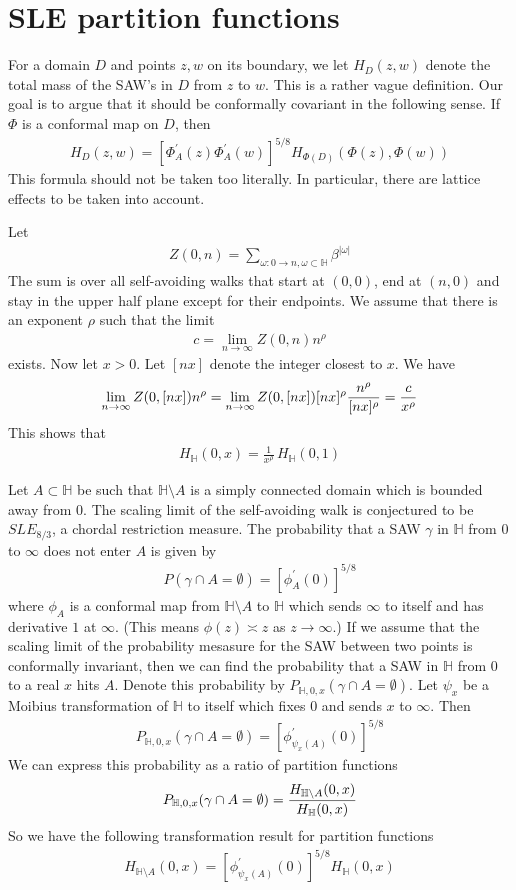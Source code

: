 \documentclass[12pt]{article}
\newcommand{\bea}{\begin{eqnarray}}
\newcommand{\eea}{\end{eqnarray}}
\newcommand{\beann}{\begin{eqnarray*}}
\newcommand{\eeann}{\end{eqnarray*}}
\def \Half {{\mathbb H}}
\def \scaleexp{{\rho}}
\begin{document}
\section{SLE partition functions}

For a domain $D$ and points $z,w$ on its boundary, we let 
$H_D(z,w)$ denote the total mass of the SAW's in $D$ from $z$ to $w$. 
This is a rather vague definition. Our goal is to argue that it 
should be conformally covariant in the following sense. If $\Phi$ is 
a conformal map on $D$, then 
\bea
H_D (z,w)  = 
[\Phi_A^\prime(z) \Phi_A^\prime(w)]^{5/8} 
H_{\Phi(D)}(\Phi(z),\Phi(w)) 
\label{eqzz}
\eea
This formula should not be taken too literally. In particular, there 
are lattice effects to be taken into account. 

Let 
\beann
Z(0,n) = \sum_{\omega:0 \rightarrow n, \omega \subset \Half} \beta^{|\omega|} 
\eeann
The sum is over all self-avoiding walks that start at $(0,0)$, end 
at $(n,0)$  and stay in the upper half plane except for their endpoints.
We assume that there is an exponent $\scaleexp$ such that 
the limit 
\beann
c=\lim_{n \rightarrow \infty} Z(0,n) n^\rho
\eeann
exists. Now let $x >0$. Let $[nx]$ denote the integer closest to $x$. 
We have
\beann
\lim_{n \rightarrow \infty} Z(0,[nx]) n^\scaleexp = 
\lim_{n \rightarrow \infty}  Z(0,[nx]) [nx]^\scaleexp 
{n^\scaleexp \over [nx]^\scaleexp}
= {c \over x^\scaleexp}
\eeann
This shows that 
\bea
H_\Half(0,x) = \frac{1}{x^\scaleexp} \, H_\Half(0,1)
\label{scaling}
\eea

Let $A \subset \Half$ be such that $\Half \setminus A$ is a simply connected
domain which is bounded away from $0$. The scaling limit of the 
self-avoiding walk is conjectured to be $SLE_{8/3}$, a 
chordal restriction measure.
The probability that a SAW $\gamma$ in $\Half$ from $0$ to $\infty$ does not 
enter $A$ is given by 
\beann
P(\gamma \cap A = \emptyset) = [\phi_A^\prime(0)]^{5/8}
\eeann
where $\phi_A$ is a conformal map from $\Half \setminus A$ to $\Half$
which sends $\infty$ to itself and has derivative $1$ at $\infty$. 
(This means $\phi(z) \asymp z$ as $z \rightarrow \infty$.)
If we assume that the scaling limit of the probability mesasure
for the SAW between two points is conformally invariant,
then we can find the probability that a SAW in $\Half$ from $0$ to a 
real $x$ hits $A$. Denote this probability by 
$P_{\Half,0,x}(\gamma \cap A =\emptyset)$.
Let $\psi_x$ be a Moibius transformation of 
$\Half$ to itself which fixes $0$ and sends $x$ to $\infty$. 
Then 
\beann
P_{\Half,0,x}(\gamma \cap A =\emptyset)=  [\phi_{\psi_x(A)}^\prime(0)]^{5/8}
\eeann
We can express this probability as a ratio of partition functions
\beann
P_{\Half,0,x}(\gamma \cap A =\emptyset) = {H_{\Half \setminus A} (0,x) 
\over H_\Half(0,x) }
\eeann
So we have the following transformation result for partition functions
\beann
H_{\Half \setminus A} (0,x)  = [\phi_{\psi_x(A)}^\prime(0)]^{5/8} H_\Half(0,x) 
\eeann
\end{document}
